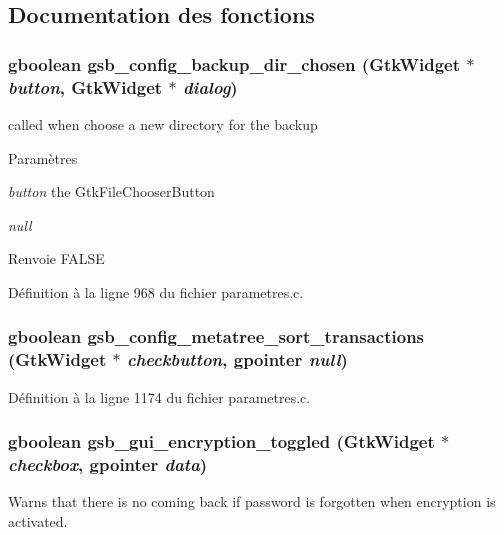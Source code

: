 \subsection{Documentation des fonctions}
\subsubsection[{gsb\_\-config\_\-backup\_\-dir\_\-chosen}]{\setlength{\rightskip}{0pt plus 5cm}gboolean gsb\_\-config\_\-backup\_\-dir\_\-chosen (GtkWidget $\ast$ {\em button}, \/  GtkWidget $\ast$ {\em dialog})}\label{parametres_8h_a6d6ce89725f0f6ea7443041a44d96e41}
called when choose a new directory for the backup


\begin{DoxyParams}{Paramètres}
\item[{\em button}]the GtkFileChooserButton \item[{\em null}]\end{DoxyParams}
\begin{DoxyReturn}{Renvoie}
FALSE 
\end{DoxyReturn}


Définition à la ligne 968 du fichier parametres.c.

\subsubsection[{gsb\_\-config\_\-metatree\_\-sort\_\-transactions}]{\setlength{\rightskip}{0pt plus 5cm}gboolean gsb\_\-config\_\-metatree\_\-sort\_\-transactions (GtkWidget $\ast$ {\em checkbutton}, \/  gpointer {\em null})}\label{parametres_8h_abeee3f7f40a97726a843a50f81c4fcac}


Définition à la ligne 1174 du fichier parametres.c.

\subsubsection[{gsb\_\-gui\_\-encryption\_\-toggled}]{\setlength{\rightskip}{0pt plus 5cm}gboolean gsb\_\-gui\_\-encryption\_\-toggled (GtkWidget $\ast$ {\em checkbox}, \/  gpointer {\em data})}\label{parametres_8h_aeda2d150b221e3ecad4af85050194e3f}
Warns that there is no coming back if password is forgotten when encryption is activated.


